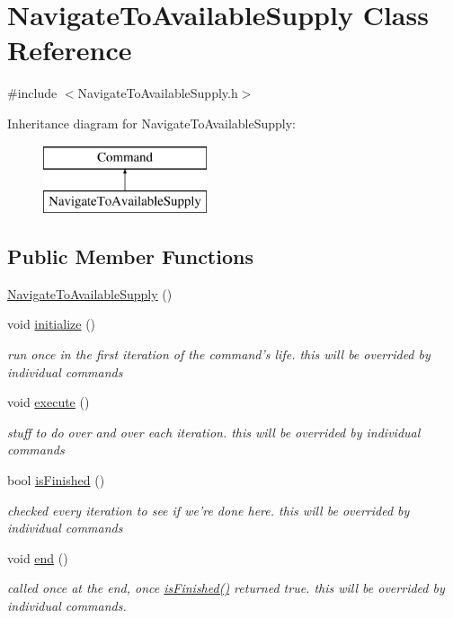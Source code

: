 \hypertarget{classNavigateToAvailableSupply}{\section{Navigate\-To\-Available\-Supply Class Reference}
\label{classNavigateToAvailableSupply}
}


{\ttfamily \#include $<$Navigate\-To\-Available\-Supply.\-h$>$}

Inheritance diagram for Navigate\-To\-Available\-Supply\-:\begin{figure}[H]
\begin{center}
\leavevmode
\includegraphics[height=2.000000cm]{classNavigateToAvailableSupply}
\end{center}
\end{figure}
\subsection*{Public Member Functions}
\begin{DoxyCompactItemize}
\item 
\hyperlink{classNavigateToAvailableSupply_ad2892c89ab5ad4def2a54e97e0a80140}{Navigate\-To\-Available\-Supply} ()
\item 
void \hyperlink{classNavigateToAvailableSupply_a77445727df0f590be945ee6fefe418a0}{initialize} ()
\begin{DoxyCompactList}\small\item\em run once in the first iteration of the command's life. this will be overrided by individual commands \end{DoxyCompactList}\item 
void \hyperlink{classNavigateToAvailableSupply_a2c1c22325cc0fa1399530b23ddca7e96}{execute} ()
\begin{DoxyCompactList}\small\item\em stuff to do over and over each iteration. this will be overrided by individual commands \end{DoxyCompactList}\item 
bool \hyperlink{classNavigateToAvailableSupply_a7c07bb4eb88b04c835c0b0d27453c43a}{is\-Finished} ()
\begin{DoxyCompactList}\small\item\em checked every iteration to see if we're done here. this will be overrided by individual commands \end{DoxyCompactList}\item 
void \hyperlink{classNavigateToAvailableSupply_a92842db484c7f60fe217403783cb8bed}{end} ()
\begin{DoxyCompactList}\small\item\em called once at the end, once \hyperlink{classNavigateToAvailableSupply_a7c07bb4eb88b04c835c0b0d27453c43a}{is\-Finished()} returned true. this will be overrided by individual commands. \end{DoxyCompactList}\end{DoxyCompactItemize}

